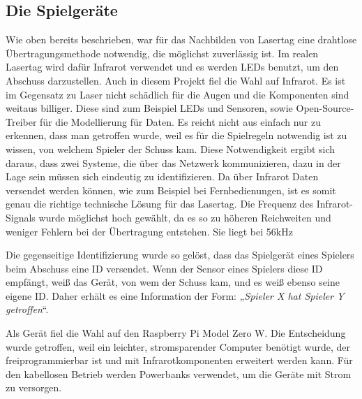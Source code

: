 \subsection{Die Spielgeräte}

Wie oben bereits beschrieben, war für das Nachbilden von Lasertag eine drahtlose Übertragungsmethode
notwendig, die möglichst zuverlässig ist.
Im realen Lasertag wird dafür Infrarot verwendet und es werden LEDs benutzt, um den Abschuss
darzustellen.
Auch in diesem Projekt fiel die Wahl auf Infrarot.
Es ist im Gegensatz zu Laser nicht schädlich für die Augen und die Komponenten sind weitaus billiger.
Diese sind zum Beispiel LEDs und Sensoren, sowie Open-Source-Treiber für die
Modellierung für Daten.
Es reicht nicht aus einfach nur zu erkennen, dass man getroffen wurde, weil es für die Spielregeln
notwendig ist zu wissen, von welchem Spieler der Schuss kam.
Diese Notwendigkeit ergibt sich daraus, dass zwei Systeme, die über das Netzwerk kommunizieren, dazu
in der Lage sein müssen sich eindeutig zu identifizieren.
Da über Infrarot Daten versendet werden können, wie zum Beispiel bei
Fernbedienungen, ist es somit genau die richtige technische Lösung für das Lasertag.
Die Frequenz des Infrarot-Signals wurde möglichst hoch gewählt, da es so zu höheren Reichweiten und weniger Fehlern bei der Übertragung entstehen. Sie liegt bei 56kHz


Die gegenseitige Identifizierung wurde so gelöst, dass das Spielgerät eines Spielers beim Abschuss
eine ID versendet.
Wenn der Sensor eines Spielers diese ID empfängt, weiß das Gerät, von wem der Schuss kam, und es
weiß ebenso seine eigene ID.
Daher erhält es eine Information der Form: „\emph{Spieler X hat Spieler Y getroffen}“.

Als Gerät fiel die Wahl auf den Raspberry Pi Model Zero W. Die Entscheidung wurde getroffen, weil
ein leichter, stromsparender Computer benötigt wurde, der freiprogrammierbar ist und mit
Infrarotkomponenten erweitert werden kann.
Für den kabellosen Betrieb werden Powerbanks verwendet, um die Geräte mit Strom zu versorgen.
